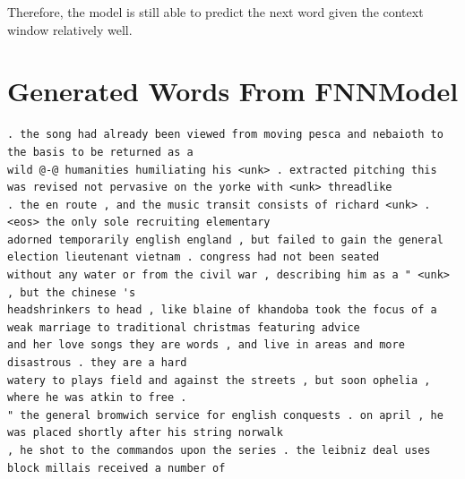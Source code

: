 \documentclass[sigconf,nonacm=true]{acmart}
\begin{document}
Therefore, the model is still able to predict the next word given the context window relatively well.









\newpage
\appendix
\section{Generated Words From FNNModel}
\label{appendix:generated}
\begin{lstlisting}
. the song had already been viewed from moving pesca and nebaioth to the basis to be returned as a
wild @-@ humanities humiliating his <unk> . extracted pitching this was revised not pervasive on the yorke with <unk> threadlike
. the en route , and the music transit consists of richard <unk> . <eos> the only sole recruiting elementary
adorned temporarily english england , but failed to gain the general election lieutenant vietnam . congress had not been seated
without any water or from the civil war , describing him as a " <unk> , but the chinese 's
headshrinkers to head , like blaine of khandoba took the focus of a weak marriage to traditional christmas featuring advice
and her love songs they are words , and live in areas and more disastrous . they are a hard
watery to plays field and against the streets , but soon ophelia , where he was atkin to free .
" the general bromwich service for english conquests . on april , he was placed shortly after his string norwalk
, he shot to the commandos upon the series . the leibniz deal uses block millais received a number of

\end{lstlisting}
\end{document}
